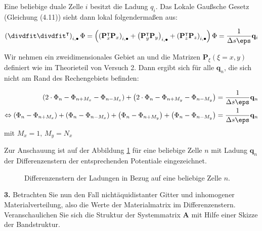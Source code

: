 \documentclass[./Protokollheft.tex]{subfiles}
\begin{document}

Eine beliebige duale Zelle $i$ besitzt die Ladung $q_i$. Das Lokale Gaußsche Gesetz (Gleichung (4.11)) sieht dann lokal folgendermaßen aus:

\begin{align}
	\left(\divdfit\divdfit^\intercal\right)_{i,\bullet}\Phi = \left( \left(\mathbf{P}_x^\intercal\mathbf{P}_x\right)_{i,\bullet} + \left(\mathbf{P}_y^\intercal\mathbf{P}_y\right)_{i,\bullet} + \left(\mathbf{P}_z^\intercal\mathbf{P}_z\right)_{i,\bullet} \right)\Phi=\frac{1}{\Delta s \eps}\mathbf{q}_i
\end{align}

Wir nehmen ein zweidimensionales Gebiet an und die Matrizen $\mathbf{P}_{\xi}(\xi=x,y)$ definiert wie im Theorieteil von Versuch 2. Dann ergibt sich für alle $\mathbf{q}_n$, die sich nicht am Rand des Rechengebiets befinden:



\begin{align}
\begin{split}
	\left(2\cdot\Phi_n - \Phi_{n+M_x} - \Phi_{n-M_x} \right) 
+ 	\left(2\cdot\Phi_n - \Phi_{n+M_y} - \Phi_{n-M_y} \right)  
&=	\frac{1}{\Delta s \eps}\mathbf{q}_n \\ 
\Leftrightarrow 	\left(\Phi_n - \Phi_{n+M_x}\right) + \left(\Phi_n - \Phi_{n-M_x} \right) 
+ 	\left(\Phi_n - \Phi_{n+M_y}\right) + \left(\Phi_n - \Phi_{n-M_y} \right)  
&=	\frac{1}{\Delta s \eps}\mathbf{q}_n \\ 
\end{split}
\end{align}
mit $M_x=1,\,M_y=N_x$

Zur Anschauung ist auf der Abbildung \ref{img:V4.Gitter1} für eine beliebige Zelle $n$ mit Ladung $\mathbf{q}_n$ der \grqq{}Differenzenstern\grqq{}  der entsprechenden Potentiale eingezeichnet. 

\begin{figure}
\begin{center}
 
\caption{Differenzenstern der Ladungen in Bezug auf eine beliebige Zelle $n$. }
\label{img:V4.Gitter1}
\end{center}
\end{figure}



\begin{framed}
	\noindent \textbf{3.} Betrachten Sie nun den Fall nichtäquidistanter Gitter
und inhomogener Materialverteilung, also die Werte der Materialmatrix im
Differenzenstern. Veranschaulichen Sie sich die Struktur der Systemmatrix $\mathbf{A}$ mit Hilfe einer Skizze der Bandstruktur.\label{exer:bandsOfSystemMat}
\end{framed}
\end{document}
